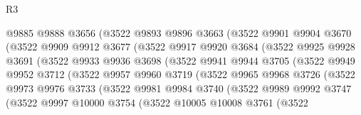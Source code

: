 \begin{lexlean}{R3}
\begin{coremodule}
                    @9885
                    @9888
                    @3656
                    (@3522
                      @9893
                      @9896
                      @3663
                      (@3522
                        @9901
                        @9904
                        @3670
                        (@3522
                          @9909
                          @9912
                          @3677
                          (@3522
                            @9917
                            @9920
                            @3684
                            (@3522
                              @9925
                              @9928
                              @3691
                              (@3522
                                @9933
                                @9936
                                @3698
                                (@3522
                                  @9941
                                  @9944
                                  @3705
                                  (@3522
                                    @9949
                                    @9952
                                    @3712
                                    (@3522
                                      @9957
                                      @9960
                                      @3719
                                      (@3522
                                        @9965
                                        @9968
                                        @3726
                                        (@3522
                                          @9973
                                          @9976
                                          @3733
                                          (@3522
                                            @9981
                                            @9984
                                            @3740
                                            (@3522
                                              @9989
                                              @9992
                                              @3747
                                              (@3522
                                                @9997
                                                @10000
                                                @3754
                                                (@3522
                                                  @10005
                                                  @10008
                                                  @3761
                                                  (@3522

\end{coremodule}
\end{lexlean}
